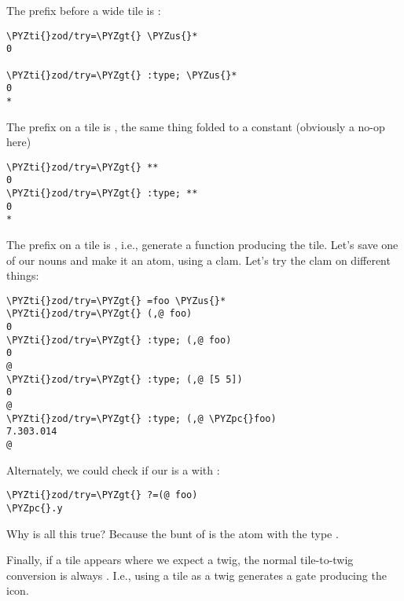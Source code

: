 The \kode{\_} prefix before a wide tile is :

\begin{framed_shaded}
\begin{Verbatim}[fontsize=\relsize{-2.5},fontseries=b,commandchars=\\\{\}]
\PYZti{}zod/try=\PYZgt{} \PYZus{}*
0

\PYZti{}zod/try=\PYZgt{} :type; \PYZus{}*
0
*
\end{Verbatim}
\end{framed_shaded}
The \kode{*} prefix on a tile is , the same thing folded to a
constant (obviously a no-op here)

\begin{framed_shaded}
\begin{Verbatim}[fontsize=\relsize{-2.5},fontseries=b,commandchars=\\\{\}]
\PYZti{}zod/try=\PYZgt{} **
0
\PYZti{}zod/try=\PYZgt{} :type; **
0
*
\end{Verbatim}
\end{framed_shaded}
The \kode{,} prefix on a tile is , i.e., generate a function
producing the tile.  Let's save one of our nouns and make it an
atom, using a clam.  Let's try the clam on different things:

\begin{framed_shaded}
\begin{Verbatim}[fontsize=\relsize{-2.5},fontseries=b,commandchars=\\\{\}]
\PYZti{}zod/try=\PYZgt{} =foo \PYZus{}*
\PYZti{}zod/try=\PYZgt{} (,@ foo)
0
\PYZti{}zod/try=\PYZgt{} :type; (,@ foo)
0
@
\PYZti{}zod/try=\PYZgt{} :type; (,@ [5 5])
0
@
\PYZti{}zod/try=\PYZgt{} :type; (,@ \PYZpc{}foo)
7.303.014
@
\end{Verbatim}
\end{framed_shaded}
Alternately, we could check if our \kode{*} is a  with :

\begin{framed_shaded}
\begin{Verbatim}[fontsize=\relsize{-2.5},fontseries=b,commandchars=\\\{\}]
\PYZti{}zod/try=\PYZgt{} ?=(@ foo)
\PYZpc{}.y
\end{Verbatim}
\end{framed_shaded}
Why is all this true?  Because the bunt of \kode{*} is the atom 
with the type .

Finally, if a tile appears where we expect a twig, the normal
tile-to-twig conversion is always .  I.e., using a tile as a
twig generates a gate producing the icon.


